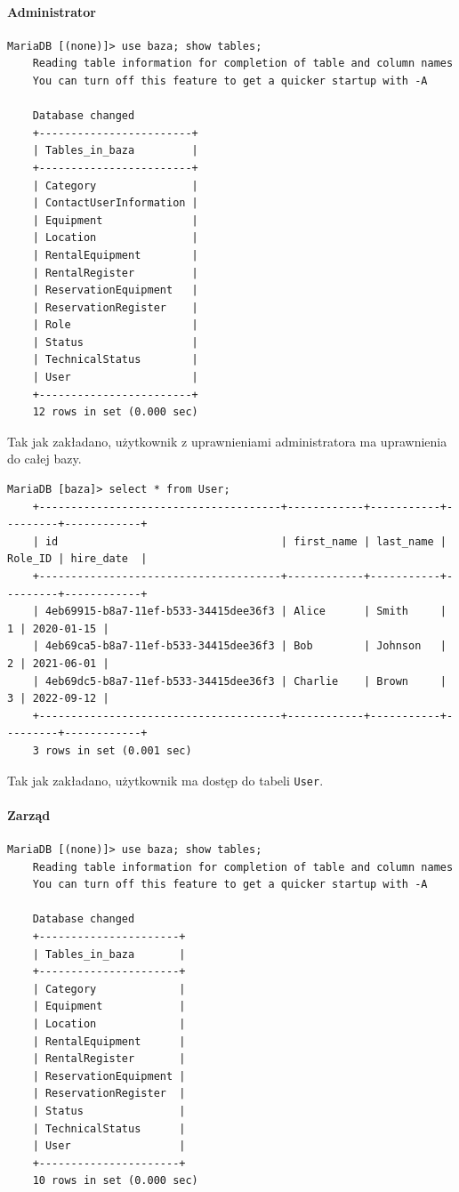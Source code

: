 \documentclass{article}
\begin{document}
\paragraph{Administrator}
\begin{verbatim}
MariaDB [(none)]> use baza; show tables;
    Reading table information for completion of table and column names
    You can turn off this feature to get a quicker startup with -A
    
    Database changed
    +------------------------+
    | Tables_in_baza         |
    +------------------------+
    | Category               |
    | ContactUserInformation |
    | Equipment              |
    | Location               |
    | RentalEquipment        |
    | RentalRegister         |
    | ReservationEquipment   |
    | ReservationRegister    |
    | Role                   |
    | Status                 |
    | TechnicalStatus        |
    | User                   |
    +------------------------+
    12 rows in set (0.000 sec)
\end{verbatim}

Tak jak zakładano, użytkownik z uprawnieniami administratora ma uprawnienia do całej bazy.

\begin{verbatim}
MariaDB [baza]> select * from User;
    +--------------------------------------+------------+-----------+---------+------------+
    | id                                   | first_name | last_name | Role_ID | hire_date  |
    +--------------------------------------+------------+-----------+---------+------------+
    | 4eb69915-b8a7-11ef-b533-34415dee36f3 | Alice      | Smith     |       1 | 2020-01-15 |
    | 4eb69ca5-b8a7-11ef-b533-34415dee36f3 | Bob        | Johnson   |       2 | 2021-06-01 |
    | 4eb69dc5-b8a7-11ef-b533-34415dee36f3 | Charlie    | Brown     |       3 | 2022-09-12 |
    +--------------------------------------+------------+-----------+---------+------------+
    3 rows in set (0.001 sec)
\end{verbatim}

Tak jak zakładano, użytkownik ma dostęp do tabeli \texttt{User}.

\paragraph{Zarząd}
\begin{verbatim}
MariaDB [(none)]> use baza; show tables;
    Reading table information for completion of table and column names
    You can turn off this feature to get a quicker startup with -A
    
    Database changed
    +----------------------+
    | Tables_in_baza       |
    +----------------------+
    | Category             |
    | Equipment            |
    | Location             |
    | RentalEquipment      |
    | RentalRegister       |
    | ReservationEquipment |
    | ReservationRegister  |
    | Status               |
    | TechnicalStatus      |
    | User                 |
    +----------------------+
    10 rows in set (0.000 sec)
\end{verbatim}
\end{document}
